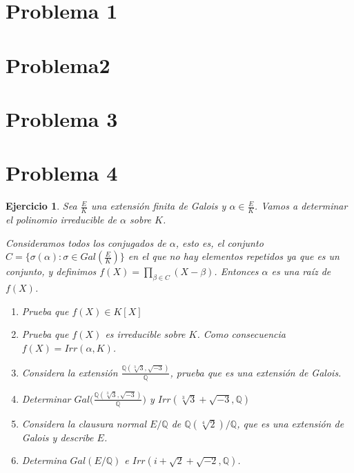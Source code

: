 \documentclass{article}
\theoremstyle{theorem-style}  %
\theoremstyle{definition-style}
\theoremstyle{example-style}
\newtheorem{exercise}{Ejercicio}[section]
\begin{document}
\makeatletter\renewcommand{\ALG@name}{Algoritmo}

\maketitle




\section{Problema 1}

\newpage
\section{Problema2}

\newpage
\section{Problema 3}

\newpage
\section{Problema 4}

\begin{exercise}
Sea $\frac{E}{K}$ una extensión finita de Galois y $\alpha \in \frac{E}{K}$. Vamos a determinar el polinomio irreducible de $\alpha$ sobre $K$. 

Consideramos todos los conjugados de $\alpha$, esto es, el conjunto $C = \{\sigma(\alpha):\sigma \in Gal(\frac{E}{K}) \}$ en el que no hay elementos repetidos ya que es un conjunto, y definimos $f(X) = \prod_{\beta \in C} (X - \beta)$. Entonces $\alpha$ es una raíz de $f(X)$. 

\begin{enumerate}
\item Prueba que $f(X) \in K[X]$
\item Prueba que $f(X)$ es irreducible sobre $K$. Como consecuencia $f(X) = Irr(\alpha,K)$.
\item Considera la extensión $\frac{\mathbb{Q}(\sqrt[3]{3},\sqrt{-3})}{\mathbb{Q}}$, prueba que es una extensión de Galois. 
\item Determinar  $Gal \Big(\frac{\mathbb{Q}(\sqrt[3]{3},\sqrt{-3})}{\mathbb{Q}}\Big)$ y $Irr(\sqrt[3]{3}+\sqrt{-3},\mathbb{Q})$
\item Considera la clausura normal $E/\mathbb{Q}$ de $\mathbb{Q}(\sqrt[4]{2})/\mathbb{Q}$, que es una extensión de Galois y describe $E$. 
\item Determina $Gal(E/\mathbb{Q})$ e $Irr(i + \sqrt{2} +\sqrt{-2},\mathbb{Q})$.
\end{enumerate}
\end{exercise}
\end{document}
